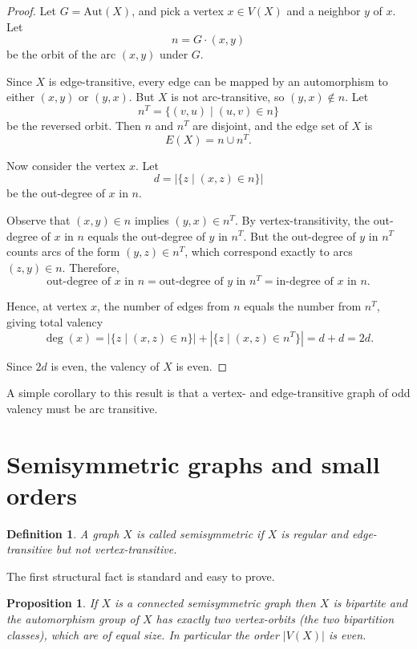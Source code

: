 \documentclass[12pt,a4paper,openany]{book}
\newtheorem{definition}{Definition}[section]
\newtheorem{proposition}{Proposition}[section]
\begin{document}
\begin{proof}
Let $G = \mathrm{Aut}(X)$, and pick a vertex $x \in V(X)$ and a neighbor $y$ of $x$. Let
\[
n = G \cdot (x, y)
\]
be the orbit of the arc $(x, y)$ under $G$.  

Since $X$ is edge-transitive, every edge can be mapped by an automorphism to either $(x, y)$ or $(y, x)$.  
But $X$ is not arc-transitive, so $(y, x) \notin n$. Let
\[
n^T = \{ (v, u) \mid (u, v) \in n \}
\]
be the reversed orbit. Then $n$ and $n^T$ are disjoint, and the edge set of $X$ is
\[
E(X) = n \cup n^T.
\]

Now consider the vertex $x$. Let
\[
d = |\{ z \mid (x, z) \in n \}|
\]
be the out-degree of $x$ in $n$.  

Observe that $(x, y) \in n$ implies $(y, x) \in n^T$. By vertex-transitivity, the out-degree of $x$ in $n$ equals the out-degree of $y$ in $n^T$. But the out-degree of $y$ in $n^T$ counts arcs of the form $(y, z) \in n^T$, which correspond exactly to arcs $(z, y) \in n$. Therefore,
\[
\text{out-degree of } x \text{ in } n = \text{out-degree of } y \text{ in } n^T = \text{in-degree of } x \text{ in } n.
\]

Hence, at vertex $x$, the number of edges from $n$ equals the number from $n^T$, giving total valency
\[
\deg(x) = |\{ z \mid (x,z) \in n \}| + |\{ z \mid (x,z) \in n^T \}| = d + d = 2d.
\]

Since $2d$ is even, the valency of $X$ is even.
\end{proof}


A simple corollary to this result is that a vertex- and edge-transitive graph of odd valency must be arc transitive. 

\section{Semisymmetric graphs and small orders}

\begin{definition}
A graph $X$ is called \emph{semisymmetric} if $X$ is regular and edge-transitive but \emph{not} vertex-transitive.

\end{definition}

The first structural fact is standard and easy to prove.

\begin{proposition}\label{prop:bipartite}
If $X$ is a connected semisymmetric graph then $X$ is bipartite and the automorphism group of $X$ has exactly two vertex-orbits (the two bipartition classes), which are of equal size. In particular the order $|V(X)|$ is even.
\end{proposition}
\end{document}
